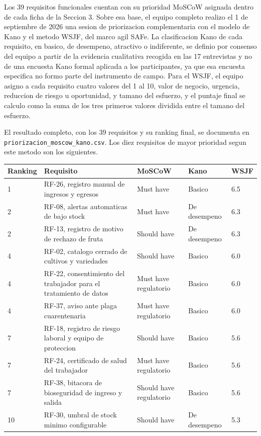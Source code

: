 \documentclass[11pt,a4paper]{article}
\newcommand{\ruta}[1]{\texttt{#1}}
\begin{document}
Los 39 requisitos funcionales cuentan con su prioridad MoSCoW asignada dentro de cada ficha de la Seccion 3. Sobre esa base, el equipo completo realizo el 1 de septiembre de 2026 una sesion de priorizacion complementaria con el modelo de Kano y el metodo WSJF, del marco agil SAFe. La clasificacion Kano de cada requisito, en basico, de desempeno, atractivo o indiferente, se definio por consenso del equipo a partir de la evidencia cualitativa recogida en las 17 entrevistas y no de una encuesta Kano formal aplicada a los participantes, ya que esa encuesta especifica no formo parte del instrumento de campo. Para el WSJF, el equipo asigno a cada requisito cuatro valores del 1 al 10, valor de negocio, urgencia, reduccion de riesgo u oportunidad, y tamano del esfuerzo, y el puntaje final se calculo como la suma de los tres primeros valores dividida entre el tamano del esfuerzo.

El resultado completo, con los 39 requisitos y su ranking final, se documenta en \ruta{priorizacion\_moscow\_kano.csv}. Los diez requisitos de mayor prioridad segun este metodo son los siguientes.

\begin{longtable}{L{1.4cm} L{7.2cm} L{3.2cm} L{2cm} L{1.2cm}}
\toprule
\textbf{Ranking} & \textbf{Requisito} & \textbf{MoSCoW} & \textbf{Kano} & \textbf{WSJF} \\
\midrule
{} & RF-26, registro manual de ingresos y egresos & Must have & Basico & 6.5 \\
2 & RF-08, alertas automaticas de bajo stock & Must have & De desempeno & 6.3 \\
2 & RF-13, registro de motivo de rechazo de fruta & Should have & De desempeno & 6.3 \\
4 & RF-02, catalogo cerrado de cultivos y variedades & Should have & Basico & 6.0 \\
4 & RF-22, consentimiento del trabajador para el tratamiento de datos & Must have regulatorio & Basico & 6.0 \\
4 & RF-37, aviso ante plaga cuarentenaria & Must have regulatorio & Basico & 6.0 \\
7 & RF-18, registro de riesgo laboral y equipo de proteccion & Should have & Basico & 5.6 \\
7 & RF-24, certificado de salud del trabajador & Must have regulatorio & Basico & 5.6 \\
7 & RF-38, bitacora de bioseguridad de ingreso y salida & Should have regulatorio & Basico & 5.6 \\
10 & RF-30, umbral de stock minimo configurable & Should have & De desempeno & 5.3 \\
\bottomrule
\end{longtable}
\end{document}
